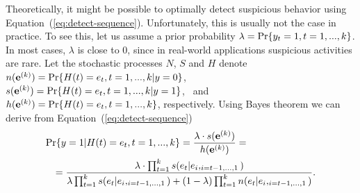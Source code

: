 Theoretically, it might be possible to optimally detect suspicious behavior using Equation~(\ref{eq:detect-sequence}). Unfortunately, this is usually not the case in practice. 
%
%
To see this, let us assume a prior probability $\lambda=\text{Pr}\{y_t=1, t=1, ..., k\}$. In most cases, $\lambda$ is close to $0$, since in real-world applications suspicious activities are rare. 
%
Let the stochastic processes $N$, $S$ and $H$ denote $n(\mathbf{e}^{\scriptsize(k)})=\text{Pr}\{H(t)=e_t, t=1, ..., k|y=0\}$, ~~$s(\mathbf{e}^{\scriptsize(k)})=\text{Pr}\{H(t)=e_t, t=1, ..., k|y=1\}$, ~and~~ $h(\mathbf{e}^{\scriptsize(k)}) = \text{Pr}\{H(t)=e_t, t=1, ..., k\}$, respectively.
Using Bayes theorem we can derive from Equation~(\ref{eq:detect-sequence})
\begin{eqnarray}
\label{eq:bayes}
        \lefteqn {\Prob\{y=1|H(t)=e_t, t=1,...,k\} = \frac{\lambda \cdot s(\evec{k})}{h(\evec{k})} = } \\
		&&=\frac{\lambda \cdot \prod_{t=1}^k s(e_t|e_i, _{i=t-1,...,1})}{\lambda \prod_{t=1}^k  s(e_t|e_i, _{i=t-1,...,1}) + (1-\lambda) \prod_{t=1}^k  n(e_t|e_i, _{i=t-1,...,1})}. \nonumber
\end{eqnarray}

